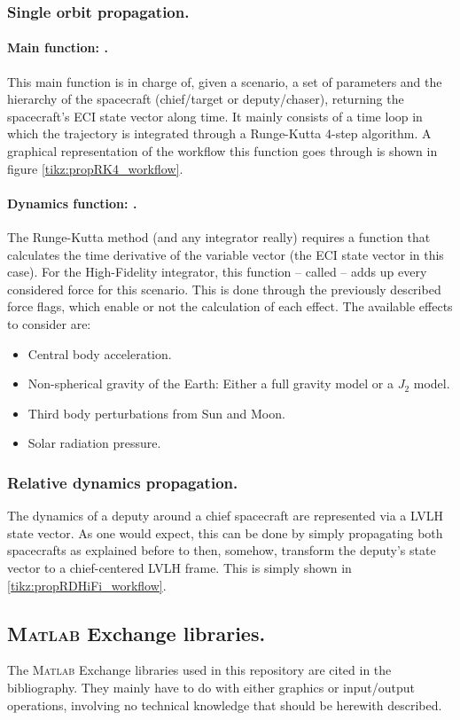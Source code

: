 		\subsubsection{Single orbit propagation.}
		\paragraph{Main function: . \\}
		\indent This main function is in charge of, given a scenario, a set of parameters and the hierarchy of the spacecraft (chief/target or deputy/chaser), returning the spacecraft's ECI state vector along time. It mainly consists of a time loop in which the trajectory is integrated through a Runge-Kutta 4-step algorithm. A graphical representation of the workflow this function goes through is shown in figure \ref{tikz:propRK4_workflow}.
		
		\paragraph{Dynamics function: .\\}
		\indent The Runge-Kutta method (and any integrator really) requires a function that calculates the time derivative of the variable vector (the ECI state vector in this case). For the High-Fidelity integrator, this function -- called  -- adds up every considered force for this scenario. This is done through the previously described force flags, which enable or not the calculation of each effect. The available effects to consider are:
		\begin{itemize}
		\item Central body acceleration. 
		\item Non-spherical gravity of the Earth: Either a full gravity model or a $J_2$ model.
		\item Third body perturbations from Sun and Moon.
		\item Solar radiation pressure.
		\end{itemize}
		\subsubsection{Relative dynamics propagation.}
		\indent The dynamics of a deputy around a chief spacecraft are represented via a LVLH state vector. As one would expect, this can be done by simply propagating both spacecrafts as explained before to then, somehow, transform the deputy's state vector to a chief-centered LVLH frame. This is simply shown in \ref{tikz:propRDHiFi_workflow}.
		
	\subsection{\textsc{Matlab} Exchange libraries.}
	\indent The \textsc{Matlab} Exchange libraries used in this repository are cited in the bibliography. They mainly have to do with either graphics or input/output operations, involving no technical knowledge that should be herewith described.
	